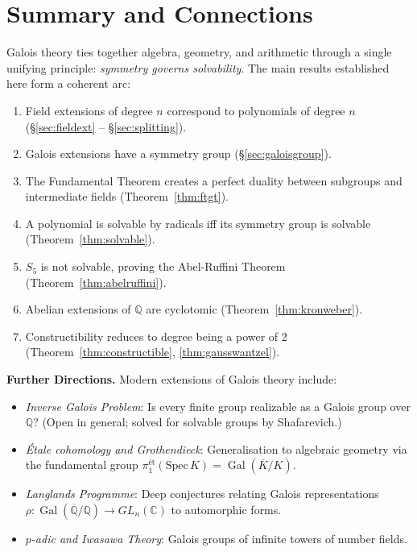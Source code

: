 \documentclass[12pt,a4paper]{amsart}
\theoremstyle{definition}
\newcommand{\Q}{\mathbb{Q}}
\newcommand{\C}{\mathbb{C}}
\newcommand{\Gal}{\operatorname{Gal}}
\begin{document}
\section{Summary and Connections}

Galois theory ties together algebra, geometry, and arithmetic through a single
unifying principle: \emph{symmetry governs solvability}. The main results
established here form a coherent arc:

\begin{enumerate}
  \item Field extensions of degree $n$ correspond to polynomials of degree $n$
        (§\ref{sec:fieldext} -- §\ref{sec:splitting}).
  \item Galois extensions have a symmetry group (§\ref{sec:galoisgroup}).
  \item The Fundamental Theorem creates a perfect duality between subgroups
        and intermediate fields (Theorem~\ref{thm:ftgt}).
  \item A polynomial is solvable by radicals iff its symmetry group is solvable
        (Theorem~\ref{thm:solvable}).
  \item $S_5$ is not solvable, proving the Abel-Ruffini Theorem
        (Theorem~\ref{thm:abelruffini}).
  \item Abelian extensions of $\Q$ are cyclotomic (Theorem~\ref{thm:kronweber}).
  \item Constructibility reduces to degree being a power of 2
        (Theorem~\ref{thm:constructible}, \ref{thm:gausswantzel}).
\end{enumerate}

\noindent\textbf{Further Directions.}
Modern extensions of Galois theory include:
\begin{itemize}
  \item \emph{Inverse Galois Problem}: Is every finite group realizable as a
        Galois group over $\Q$? (Open in general; solved for solvable groups
        by Shafarevich.)
  \item \emph{\'Etale cohomology and Grothendieck}: Generalisation to algebraic
        geometry via the fundamental group $\pi_1^{\text{\'et}}(\mathrm{Spec}\,K)
        = \Gal(\overline{K}/K)$.
  \item \emph{Langlands Programme}: Deep conjectures relating Galois
        representations $\rho: \Gal(\overline{\Q}/\Q) \to GL_n(\C)$ to
        automorphic forms.
  \item \emph{$p$-adic and Iwasawa Theory}: Galois groups of infinite towers of
        number fields.
\end{itemize}
\end{document}

